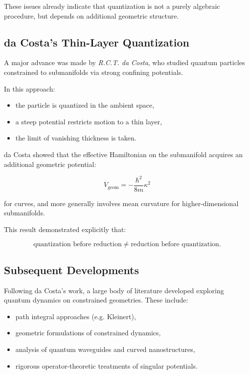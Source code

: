 \documentclass[11pt]{article}
\begin{document}
These issues already indicate that quantization is not a purely algebraic procedure, but depends on additional geometric structure.

\subsection{da Costa's Thin-Layer Quantization}

A major advance was made by \textit{R.C.T. da Costa}, who studied quantum particles constrained to submanifolds via strong confining potentials.

In this approach:

\begin{itemize}
\item the particle is quantized in the ambient space,
\item a steep potential restricts motion to a thin layer,
\item the limit of vanishing thickness is taken.
\end{itemize}

da Costa showed that the effective Hamiltonian on the submanifold acquires an additional geometric potential:

\begin{equation}
V_{\mathrm{geom}} = -\frac{\hbar^2}{8m}\kappa^2
\end{equation}

for curves, and more generally involves mean curvature for higher-dimensional submanifolds.

This result demonstrated explicitly that:

\begin{equation}
\text{quantization before reduction} \neq \text{reduction before quantization}.
\end{equation}

\subsection{Subsequent Developments}

Following da Costa's work, a large body of literature developed exploring quantum dynamics on constrained geometries. These include:

\begin{itemize}
\item path integral approaches (e.g. Kleinert),
\item geometric formulations of constrained dynamics,
\item analysis of quantum waveguides and curved nanostructures,
\item rigorous operator-theoretic treatments of singular potentials.
\end{itemize}
\end{document}
